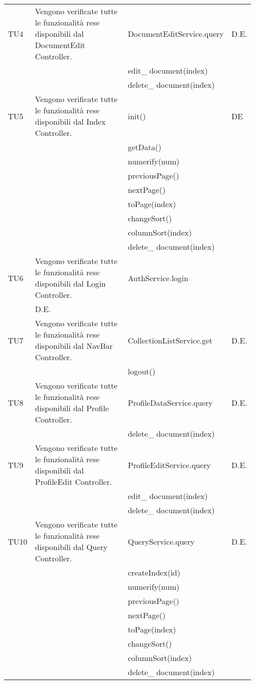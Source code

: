 \begin{center}
\begin{longtable}{|p{2cm}|p{7cm}|p{7cm}|p{2cm}|}
\midrule
TU4
& Vengono verificate tutte le funzionalità rese disponibili dal DocumentEdit Controller.
& DocumentEditService.query
& D.E.\\
& & edit\_ document(index)\\
& & delete\_ document(index)\\



\midrule
TU5
& Vengono verificate tutte le funzionalità rese disponibili dal Index Controller.
&  init() & DE\\
& & getData()& \\
& &  numerify(num)& \\
& &  previousPage()& \\
& &  nextPage()& \\
& &  toPage(index)& \\
& &  changeSort()& \\
& &  columnSort(index)& \\
& &  delete\_ document(index)& \\




\midrule
TU6
& Vengono verificate tutte le funzionalità rese disponibili dal Login Controller.
& AuthService.login\\
& D.E.\\


\midrule
TU7
& Vengono verificate tutte le funzionalità rese disponibili dal NavBar Controller.
& CollectionListService.get
& D.E.\\
& & logout()\\



\midrule
TU8
& Vengono verificate tutte le funzionalità rese disponibili dal Profile Controller.
& ProfileDataService.query
& D.E.\\
& & delete\_ document(index)\\


\midrule
TU9
& Vengono verificate tutte le funzionalità rese disponibili dal ProfileEdit Controller.
& ProfileEditService.query
& D.E.\\

& & edit\_ document(index)\\
& & delete\_ document(index)\\


\midrule
TU10
& Vengono verificate tutte le funzionalità rese disponibili dal Query Controller.
& QueryService.query
& D.E.\\
& & createIndex(id)\\
& & numerify(num)\\
& & previousPage()\\
& & nextPage()\\
& & toPage(index)\\
& & changeSort()\\
& & columnSort(index)\\
& & delete\_ document(index)\\




\end{longtable}
\end{center}
